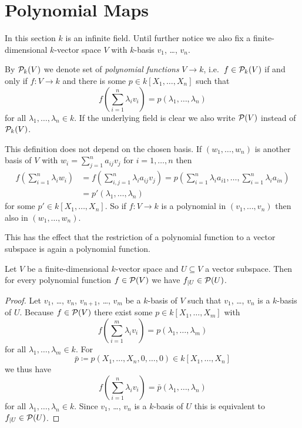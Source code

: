 




\section{Polynomial Maps}


In this section $k$ is an infinite field.
Until further notice we also fix a finite-dimensional $k$-vector space $V$ with $k$-basis $v_1$, \dots, $v_n$.


\begin{defi}
  By $\mathcal{P}_k(V)$ we denote set of \emph{polynomial functions} $V \to k$, i.e.\ $f \in \mathcal{P}_k(V)$ if and only if $f \colon V \to k$ and there is some $p \in k[X_1, \dotsc, X_n]$ such that
  \[
      f\left( \sum_{i=1}^n \lambda_i v_i \right)
    = p(\lambda_1, \dotsc, \lambda_n)
  \]
  for all $\lambda_1, \dotsc, \lambda_n \in k$.
  If the underlying field is clear we also write $\mathcal{P}(V)$ instead of $\mathcal{P}_k(V)$.
\end{defi}


This definition does not depend on the chosen basis.
If $(w_1, \dotsc, w_n)$ is another basis of $V$ with $w_i = \sum_{j=1}^n a_{ij} v_j$ for $i = 1, \dotsc, n$ then
\begin{align*}
      f\left( \sum_{i=1}^n \lambda_i w_i \right)
  &=  f\left( \sum_{i,j=1}^n \lambda_i a_{ij} v_j \right)
   =  p\left( \sum_{i=1}^n \lambda_i a_{i1}, \dotsc, \sum_{i=1}^n \lambda_{i} a_{in} \right)  \\
  &=  p'(\lambda_1, \dotsc, \lambda_n)
\end{align*}
for some $p' \in k[X_1, \dotsc, X_n]$.
So if $f \colon V \to k$ is a polynomial in $(v_1, \dotsc, v_n)$ then also in $(w_1, \dotsc, w_n)$.

This has the effect that the restriction of a polynomial function to a vector subspace is again a polynomial function.

\begin{lem}
  Let $V$ be a finite-dimensional $k$-vector space and $U \subseteq V$ a vector subspace.
  Then for every polynomial function $f \in \mathcal{P}(V)$ we have $f_{|U} \in \mathcal{P}(U)$.
\end{lem}
\begin{proof}
  Let $v_1$, \dots, $v_n$, $v_{n+1}$, \dots, $v_m$ be a $k$-basis of $V$ such that $v_1$, \dots, $v_n$ is a $k$-basis of $U$.
  Because $f \in \mathcal{P}(V)$ there exist some $p \in k[X_1, \dotsc, X_m]$ with
  \[
      f\left( \sum_{i=1}^m \lambda_i v_i \right)
    = p(\lambda_1, \dotsc, \lambda_m)
  \]
  for all $\lambda_1, \dotsc, \lambda_m \in k$. For
  \[
              \bar{p}
    \coloneqq p(X_1, \dotsc, X_n, 0, \dotsc, 0)
    \in       k[X_1, \dotsc, X_n]
  \]
  we thus have
  \[
      f\left( \sum_{i=1}^n \lambda_i v_i \right)
    = \bar{p}(\lambda_1, \dotsc, \lambda_n)
  \]
  for all $\lambda_1, \dotsc, \lambda_n \in k$.
  Since $v_1$, \dots, $v_n$ is a $k$-basis of $U$ this is equivalent to $f_{|U} \in \mathcal{P}(U)$.
\end{proof}


